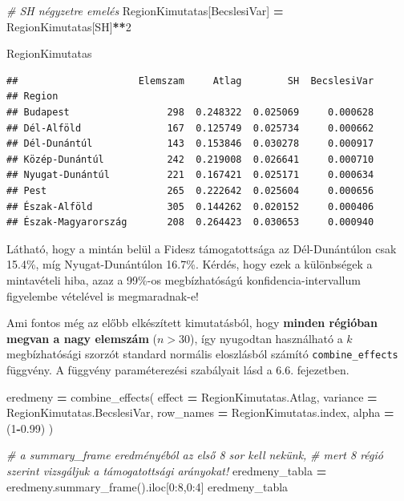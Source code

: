 \documentclass[
]{book}
\newenvironment{Shaded}{\begin{snugshade}}{\end{snugshade}}
\newcommand{\CommentTok}[1]{\textcolor[rgb]{0.56,0.35,0.01}{\textit{#1}}}
\newcommand{\DecValTok}[1]{\textcolor[rgb]{0.00,0.00,0.81}{#1}}
\newcommand{\FloatTok}[1]{\textcolor[rgb]{0.00,0.00,0.81}{#1}}
\newcommand{\NormalTok}[1]{#1}
\newcommand{\OperatorTok}[1]{\textcolor[rgb]{0.81,0.36,0.00}{\textbf{#1}}}
\newcommand{\StringTok}[1]{\textcolor[rgb]{0.31,0.60,0.02}{#1}}
\begin{document}
\begin{Shaded}
\begin{Highlighting}[]
\CommentTok{\# SH négyzetre emelés}
\NormalTok{RegionKimutatas[}\StringTok{\textquotesingle{}BecslesiVar\textquotesingle{}}\NormalTok{] }\OperatorTok{=}\NormalTok{ RegionKimutatas[}\StringTok{\textquotesingle{}SH\textquotesingle{}}\NormalTok{]}\OperatorTok{**}\DecValTok{2}

\NormalTok{RegionKimutatas}
\end{Highlighting}
\end{Shaded}

\begin{verbatim}
##                     Elemszam     Atlag        SH  BecslesiVar
## Region                                                       
## Budapest                 298  0.248322  0.025069     0.000628
## Dél-Alföld               167  0.125749  0.025734     0.000662
## Dél-Dunántúl             143  0.153846  0.030278     0.000917
## Közép-Dunántúl           242  0.219008  0.026641     0.000710
## Nyugat-Dunántúl          221  0.167421  0.025171     0.000634
## Pest                     265  0.222642  0.025604     0.000656
## Észak-Alföld             305  0.144262  0.020152     0.000406
## Észak-Magyarország       208  0.264423  0.030653     0.000940
\end{verbatim}

Látható, hogy a mintán belül a Fidesz támogatottsága az Dél-Dunántúlon csak 15.4\%, míg Nyugat-Dunántúlon 16.7\%. Kérdés, hogy ezek a különbségek a mintavételi hiba, azaz a 99\%-os megbízhatóságú konfidencia-intervallum figyelembe vételével is megmaradnak-e!

Ami fontos még az előbb elkészített kimutatásból, hogy \textbf{minden régióban megvan a nagy elemszám} (\(n>30\)), így nyugodtan használható a \(k\) megbízhatósági szorzót standard normális eloszlásból számító \texttt{combine\_effects} függvény. A függvény paraméterezési szabályait lásd a 6.6. fejezetben.

\begin{Shaded}
\begin{Highlighting}[]
\NormalTok{eredmeny }\OperatorTok{=}\NormalTok{ combine\_effects(}
\NormalTok{  effect }\OperatorTok{=}\NormalTok{ RegionKimutatas.Atlag,}
\NormalTok{  variance }\OperatorTok{=}\NormalTok{ RegionKimutatas.BecslesiVar,}
\NormalTok{  row\_names }\OperatorTok{=}\NormalTok{ RegionKimutatas.index,}
\NormalTok{  alpha }\OperatorTok{=}\NormalTok{ (}\DecValTok{1}\OperatorTok{{-}}\FloatTok{0.99}\NormalTok{)}
\NormalTok{)}

\CommentTok{\# a summary\_frame eredményéból az első 8 sor kell nekünk,}
\CommentTok{\# mert 8 régió szerint vizsgáljuk a támogatottsági arányokat!}
\NormalTok{eredmeny\_tabla }\OperatorTok{=}\NormalTok{ eredmeny.summary\_frame().iloc[}\DecValTok{0}\NormalTok{:}\DecValTok{8}\NormalTok{,}\DecValTok{0}\NormalTok{:}\DecValTok{4}\NormalTok{]}
\NormalTok{eredmeny\_tabla}
\end{Highlighting}
\end{Shaded}
\end{document}
